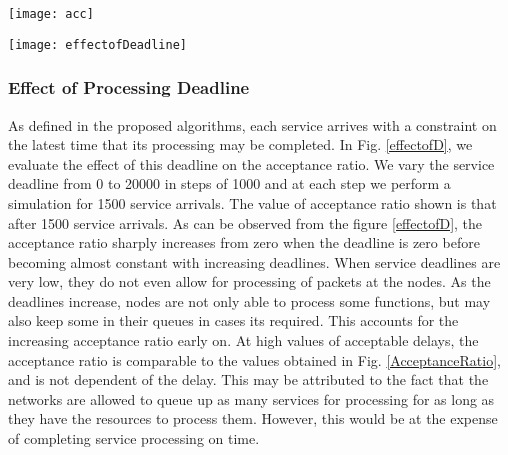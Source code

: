 \documentclass[conference]{IEEEtran}
\begin{document}
\begin{figure*}[t]
\setlength{\abovecaptionskip}{7pt plus 0pt minus 0pt}
\setlength{\belowcaptionskip}{7pt plus 0pt minus 0pt}

\begin{minipage}{.49\textwidth}
\centering
\resizebox{.99\textwidth}{!}
{\texttt{[image: acc]}}
  \caption{Service Acceptance Ratio}\label{AcceptanceRatio}
\end{minipage}
\begin{minipage}{.49\textwidth}
\resizebox{.99\textwidth}{!}
{\texttt{[image: effectofDeadline]}}
  \caption{Effect of Deadline on Acceptance Ratio}\label{effectofD}
\end{minipage}
\end{figure*}
\subsubsection{Effect of Processing Deadline} As defined in the proposed algorithms, each service arrives with a constraint on the latest time that its processing may be completed. In Fig. \ref{effectofD}, we evaluate the effect of this deadline on the acceptance ratio. We vary the service deadline from 0 to 20000 in steps of 1000 and at each step we perform a simulation for 1500 service arrivals. The value of acceptance ratio shown is that after 1500 service arrivals. As can be observed from the figure \ref{effectofD}, the acceptance ratio sharply increases from zero when the deadline is zero before becoming almost constant with increasing deadlines. When service deadlines are very low, they do not even allow for processing of packets at the nodes. As the deadlines increase, nodes are not only able to process some functions, but may also keep some in their queues in cases its required. This accounts for the increasing acceptance ratio early on. At high values of acceptable delays, the acceptance ratio is comparable to the values obtained in Fig. \ref{AcceptanceRatio}, and is not dependent of the delay. This may be attributed to the fact that the networks are allowed to queue up as many services for processing for as long as they have the resources to process them. However, this would be at the expense of completing service processing on time. 
\end{document}
